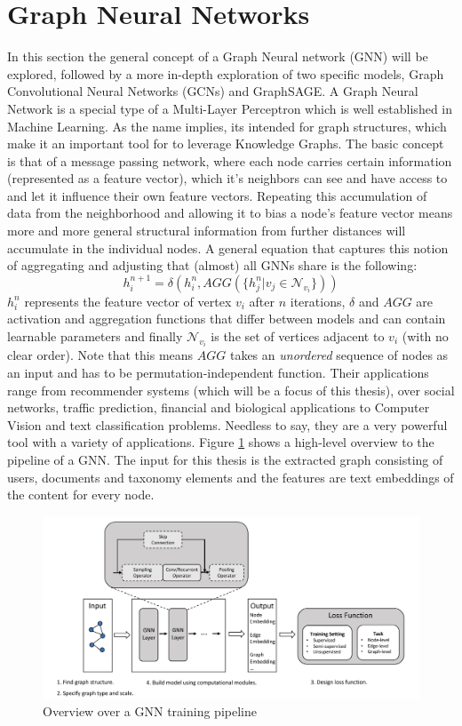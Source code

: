 \documentclass[draft,final]{vutinfth} %
\begin{document}
\section{Graph Neural Networks}
In this section the general concept of a Graph Neural network (GNN) will be explored, followed by a more in-depth exploration of two specific models, Graph Convolutional Neural Networks (GCNs) and GraphSAGE.
A Graph Neural Network is a special type of a Multi-Layer Perceptron which is well established in Machine Learning. As the name implies, its intended for graph structures, which make it an important tool for to leverage Knowledge Graphs. The basic concept is that of a message passing network, where each node carries certain information (represented as a feature vector), which it's neighbors can see and have access to and let it influence their own feature vectors. Repeating this accumulation of data from the neighborhood and allowing it to bias a node's feature vector means more and more general structural information from further distances will accumulate in the individual nodes. A general equation that captures this notion of aggregating and adjusting that (almost) all GNNs share is the following:
$$h^{n+1}_i = \delta(h^n_i,AGG(\{h^n_j | v_j \in \mathcal{N}_{v_i}\}))$$
$h^n_i$ represents the feature vector of vertex $v_i$ after $n$ iterations, $\delta$ and $AGG$ are activation and aggregation functions that differ between models and can contain learnable parameters and finally $\mathcal{N}_{v_i}$ is the set of vertices adjacent to $v_i$ (with no clear order). Note that this means $AGG$ takes an \textit{unordered} sequence of nodes as an input and has to be permutation-independent function. 
Their applications range from recommender systems (which will be a focus of this thesis), over social networks, traffic prediction, financial and biological applications to Computer Vision and text classification problems. Needless to say, they are a very powerful tool with a variety of applications. \cite{Explainable_GNNs} Figure \ref{fig:GNN-pipeline} shows a high-level overview to the pipeline of a GNN. The input for this thesis is the extracted graph consisting of users, documents and taxonomy elements and the features are text embeddings of the content for every node.
\begin{figure}[h!]
    \centering
    \includegraphics[width=1.0\linewidth]{graphics/GNN-pipeline.png}
    \caption{Overview over a GNN training pipeline \cite{gnn_overview}}
    \label{fig:GNN-pipeline}
\end{figure}
\end{document}
